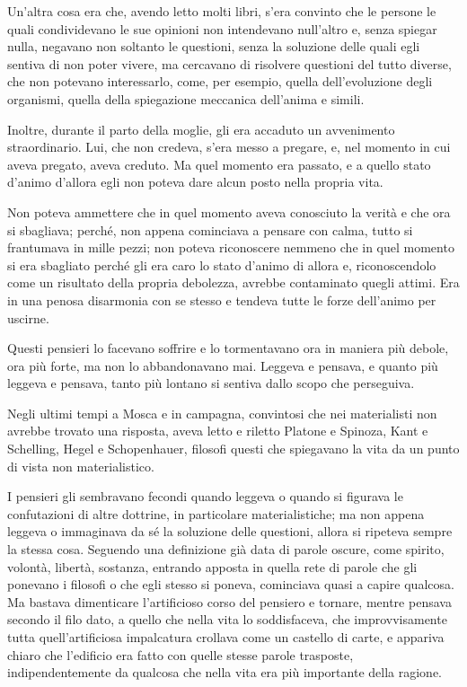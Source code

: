 Un'altra cosa era che, avendo letto molti libri, s'era convinto che le persone le quali condividevano le sue opinioni non intendevano null'altro e, senza spiegar nulla, negavano non soltanto le questioni, senza la soluzione delle quali egli sentiva di non poter vivere, ma cercavano di risolvere questioni del tutto diverse, che non potevano interessarlo, come, per esempio, quella dell'evoluzione degli organismi, quella della spiegazione meccanica dell'anima e simili. 

Inoltre, durante il parto della moglie, gli era accaduto un avvenimento straordinario. Lui, che non credeva, s'era messo a pregare, e, nel momento in cui aveva pregato, aveva creduto. Ma quel momento era passato, e a quello stato d'animo d'allora egli non poteva dare alcun posto nella propria vita. 

Non poteva ammettere che in quel momento aveva conosciuto la verità e che ora si sbagliava; perché, non appena cominciava a pensare con calma, tutto si frantumava in mille pezzi; non poteva riconoscere nemmeno che in quel momento si era sbagliato perché gli era caro lo stato d'animo di allora e, riconoscendolo come un risultato della propria debolezza, avrebbe contaminato quegli attimi. Era in una penosa disarmonia con se stesso e tendeva tutte le forze dell'animo per uscirne. 

\label{ix-7} 

Questi pensieri lo facevano soffrire e lo tormentavano ora in maniera più debole, ora più forte, ma non lo abbandonavano mai. Leggeva e pensava, e quanto più leggeva e pensava, tanto più lontano si sentiva dallo scopo che perseguiva. 

Negli ultimi tempi a Mosca e in campagna, convintosi che nei materialisti non avrebbe trovato una risposta, aveva letto e riletto Platone e Spinoza, Kant e Schelling, Hegel e Schopenhauer, filosofi questi che spiegavano la vita da un punto di vista non materialistico. 

I pensieri gli sembravano fecondi quando leggeva o quando si figurava le confutazioni di altre dottrine, in particolare materialistiche; ma non appena leggeva o immaginava da sé la soluzione delle questioni, allora si ripeteva sempre la stessa cosa. Seguendo una definizione già data di parole oscure, come spirito, volontà, libertà, sostanza, entrando apposta in quella rete di parole che gli ponevano i filosofi o che egli stesso si poneva, cominciava quasi a capire qualcosa. Ma bastava dimenticare l'artificioso corso del pensiero e tornare, mentre pensava secondo il filo dato, a quello che nella vita lo soddisfaceva, che improvvisamente tutta quell'artificiosa impalcatura crollava come un castello di carte, e appariva chiaro che l'edificio era fatto con quelle stesse parole trasposte, indipendentemente da qualcosa che nella vita era più importante della ragione. 

